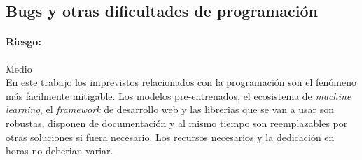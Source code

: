 \subsection{Bugs y otras dificultades de programación}
\paragraph{Riesgo:} Medio\\
En este trabajo los imprevistos relacionados con la programación son el fenómeno
más facilmente mitigable. Los modelos pre-entrenados, el ecosistema de \textit{machine learning},
el \textit{framework} de desarrollo web y las librerias que se van a usar son robustas,
disponen de documentación y al mismo tiempo son reemplazables por otras soluciones si fuera necesario.
Los recursos necesarios y la dedicación en horas no deberian variar.